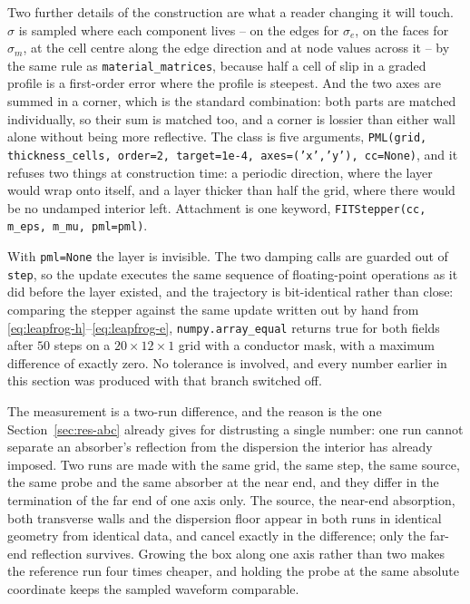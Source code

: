 Two further details of the construction are what a reader changing it will touch. $\sigma$ is sampled where
each component lives -- on the edges for $\sigma_e$, on the faces for $\sigma_m$, at the cell centre along the
edge direction and at node values across it -- by the same rule as \texttt{material\_matrices}, because half a
cell of slip in a graded profile is a first-order error where the profile is steepest. And the two axes are
summed in a corner, which is the standard combination: both parts are matched individually, so their sum is
matched too, and a corner is lossier than either wall alone without being more reflective. The class is five
arguments, \texttt{PML(grid, thickness\_cells, order=2, target=1e-4, axes=('x','y'), cc=None)}, and it refuses
two things at construction time: a periodic direction, where the layer would wrap onto itself, and a layer
thicker than half the grid, where there would be no undamped interior left. Attachment is one keyword,
\texttt{FITStepper(cc, m\_eps, m\_mu, pml=pml)}.

With \texttt{pml=None} the layer is invisible. The two damping calls are guarded out of \texttt{step}, so the
update executes the same sequence of floating-point operations as it did before the layer existed, and the
trajectory is bit-identical rather than close: comparing the stepper against the same update written out by
hand from \eqref{eq:leapfrog-h}--\eqref{eq:leapfrog-e}, \texttt{numpy.array\_equal} returns true for both
fields after $50$ steps on a $20\times12\times1$ grid with a conductor mask, with a maximum difference of
exactly zero. No tolerance is involved, and every number earlier in this section was produced with that branch
switched off.

The measurement is a two-run difference, and the reason is the one Section~\ref{sec:res-abc} already gives for
distrusting a single number: one run cannot separate an absorber's reflection from the dispersion the interior
has already imposed. Two runs are made with the same grid, the same step, the same source, the same probe and
the same absorber at the near end, and they differ in the termination of the far end of one axis only. The
source, the near-end absorption, both transverse walls and the dispersion floor appear in both runs in
identical geometry from identical data, and cancel exactly in the difference; only the far-end reflection
survives. Growing the box along one axis rather than two makes the reference run four times cheaper, and
holding the probe at the same absolute coordinate keeps the sampled waveform comparable.

